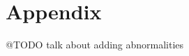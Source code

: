 \documentclass[
11pt, %
english, %
singlespacing, %
headsepline, %
]{MastersDoctoralThesis} %
\begin{document}
\chapter*{Appendix}
@TODO talk about adding abnormalities


\appendix %



%
%


\printbibliography[heading=bibintoc]

\end{document}
